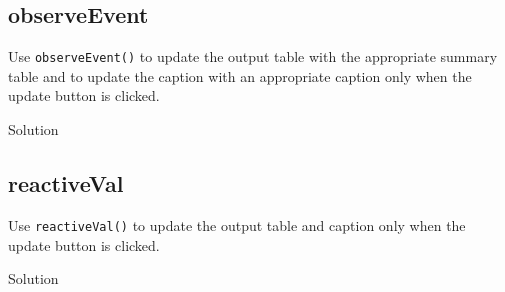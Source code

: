 \documentclass[
  oneside]{book}
\newenvironment{Shaded}{\begin{snugshade}}{\end{snugshade}}
\newcommand{\AttributeTok}[1]{\textcolor[rgb]{0.77,0.63,0.00}{#1}}
\newcommand{\ConstantTok}[1]{\textcolor[rgb]{0.00,0.00,0.00}{#1}}
\newcommand{\ControlFlowTok}[1]{\textcolor[rgb]{0.13,0.29,0.53}{\textbf{#1}}}
\newcommand{\FunctionTok}[1]{\textcolor[rgb]{0.00,0.00,0.00}{#1}}
\newcommand{\NormalTok}[1]{#1}
\newcommand{\OtherTok}[1]{\textcolor[rgb]{0.56,0.35,0.01}{#1}}
\newcommand{\SpecialCharTok}[1]{\textcolor[rgb]{0.00,0.00,0.00}{#1}}
\newcommand{\StringTok}[1]{\textcolor[rgb]{0.31,0.60,0.02}{#1}}
\begin{document}
\hypertarget{observeevent-2}{%
\subsection{observeEvent}\label{observeevent-2}}

Use \texttt{observeEvent}\texttt{()} to update the output table with the appropriate summary table and to update the caption with an appropriate caption only when the update button is clicked.

Solution

\begin{Shaded}
\end{Shaded}

\hypertarget{reactiveval-1}{%
\subsection{reactiveVal}\label{reactiveval-1}}

Use \texttt{reactiveVal}\texttt{()} to update the output table and caption only when the update button is clicked.

Solution
\end{document}
